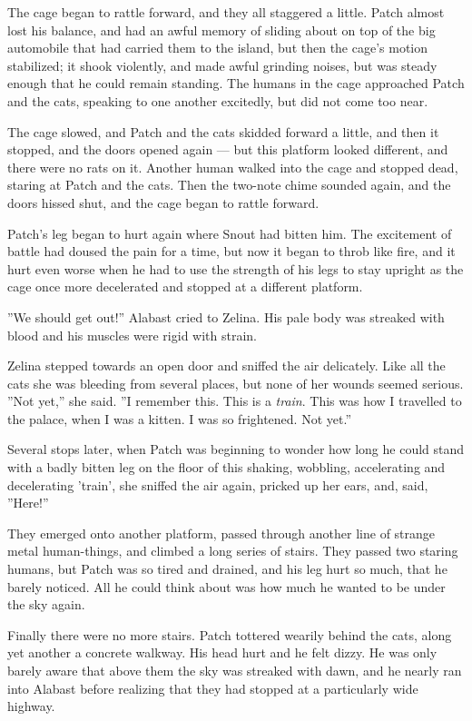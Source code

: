 \documentclass[12pt]{book}
\begin{document}
The cage began to rattle forward, and they all staggered a little. Patch almost lost his balance, and had an awful memory of sliding about on top of the big automobile that had carried them to the island, but then the cage's motion stabilized; it shook violently, and made awful grinding noises, but was steady enough that he could remain standing. The humans in the cage approached Patch and the cats, speaking to one another excitedly, but did not come too near.

The cage slowed, and Patch and the cats skidded forward a little, and then it stopped, and the doors opened again ---
but this platform looked different, and there were no rats on it. Another human walked into the cage and stopped dead, staring at Patch and the cats. Then the two-note chime sounded again, and the doors hissed shut, and the cage began to rattle forward.

Patch's leg began to hurt again where Snout had bitten him. The excitement of battle had doused the pain for a time, but now it began to throb like fire, and it hurt even worse when he had to use the strength of his legs to stay upright as the cage once more decelerated and stopped at a different platform.

''We should get out!'' Alabast cried to Zelina. His pale body was streaked with blood and his muscles were rigid with strain.

Zelina stepped towards an open door and sniffed the air delicately. Like all the cats she was bleeding from several places, but none of her wounds seemed serious. ''Not yet,'' she said. ''I remember this. This is a {\it train}. This was how I travelled to the palace, when I was a kitten. I was so frightened. Not yet.''

Several stops later, when Patch was beginning to wonder how long he could stand with a badly bitten leg on the floor of this shaking, wobbling, accelerating and decelerating 'train', she sniffed the air again, pricked up her ears, and, said, ''Here!''

They emerged onto another platform, passed through another line of strange metal human-things, and climbed a long series of stairs. They passed two staring humans, but Patch was so tired and drained, and his leg hurt so much, that he barely noticed. All he could think about was how much he wanted to be under the sky again.

Finally there were no more stairs. Patch tottered wearily behind the cats, along yet another a concrete walkway. His head hurt and he felt dizzy. He was only barely aware that above them the sky was streaked with dawn, and he nearly ran into Alabast before realizing that they had stopped at a particularly wide highway.
\end{document}
